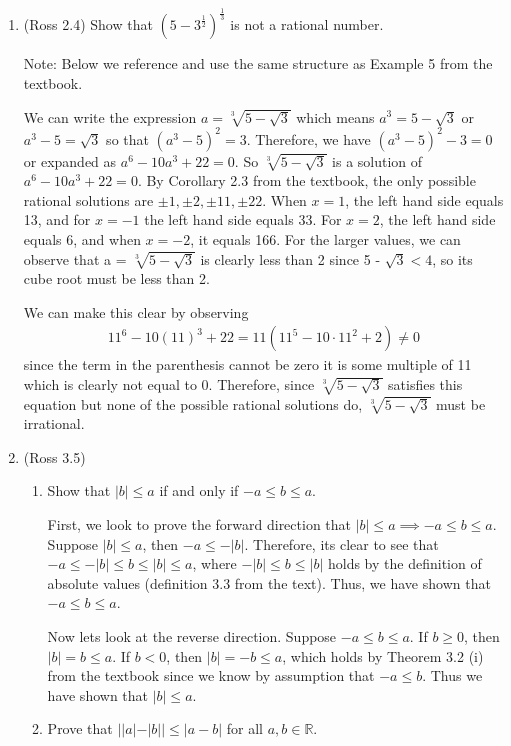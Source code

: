 \documentclass [10pt]{article}
\newcommand{\jg}[1]{{\color{blue} #1}}
\begin{document}
\begin{enumerate}
{}
\clearpage
\item (Ross 2.4) Show that $(5-3^{\frac{1}{2}})^{\frac{1}{3}}$ is not a rational
number.

\jg{
Note: Below we reference and use the same structure as Example 5 from the textbook.

We can write the expression $a = \sqrt[3]{5 - \sqrt{3}}$ which means $a^3 = 5 - \sqrt{3}$ or $a^3 - 5 = \sqrt{3}$ so that $(a^3 - 5)^2 = 3$. Therefore, we have $(a^3 - 5)^2 - 3= 0$ or expanded as $a^6 - 10a^3 + 22 = 0$. So $\sqrt[3]{5 - \sqrt{3}}$ is a solution of $a^6 - 10a^3 + 22 = 0$. By Corollary 2.3 from the textbook, the only possible rational solutions are $\pm 1, \pm 2, \pm 11, \pm 22$. When $x = 1$, the left hand side equals 13, and for $x = -1$ the left hand side equals 33. For $x = 2$, the left hand side equals 6, and when $x = -2$, it equals 166. For the larger values, we can observe that a = $\sqrt[3]{5 - \sqrt{3}}$ is clearly less than 2 since 5 - $\sqrt{3} < 4$, so its cube root must be less than 2. 

We can make this clear by observing 
\begin{align*}
    11^6 - 10(11)^3 + 22 = 11(11^5 - 10 \cdot 11^2 + 2) \neq 0
\end{align*}
since the term in the parenthesis cannot be zero it is some multiple of 11 which is clearly not equal to 0. Therefore, since $\sqrt[3]{5 - \sqrt{3}}$ satisfies this equation but none of the possible rational solutions do, $\sqrt[3]{5 - \sqrt{3}}$ must be irrational.
}
\clearpage
\item (Ross 3.5)
\begin{enumerate}
\item Show that $|b| \leq a$ if and only if $-a \leq b \leq a.$

\jg{
First, we look to prove the forward direction that $|b| \leq a \implies -a \leq b \leq a$. Suppose $|b| \leq a$, then $-a \leq - |b|$. Therefore, its clear to see that $-a \leq -|b| \leq b \leq |b| \leq a$, where $-|b| \leq b \leq |b|$ holds by the definition of absolute values (definition 3.3 from the text). Thus, we have shown that $-a \leq b \leq a$. 

Now lets look at the reverse direction. Suppose $-a \leq b \leq a$. If $b \geq 0$, then $|b| = b \leq a$. If $b < 0$, then $|b| = -b \leq a$, which holds by Theorem 3.2 (i) from the textbook since we know by assumption that $-a \leq b$. Thus we have shown that $|b| \leq a$. \\
}
\item Prove that $||a|-|b|| \leq |a-b|$ for all $a, b \in \mathbb{R}$.


\end{enumerate}
\end{enumerate}
\end{document}
